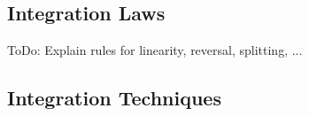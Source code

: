 


\subsection{Integration Laws} 
ToDo: Explain rules for linearity, reversal, splitting, ...








\subsection{Integration Techniques} 

